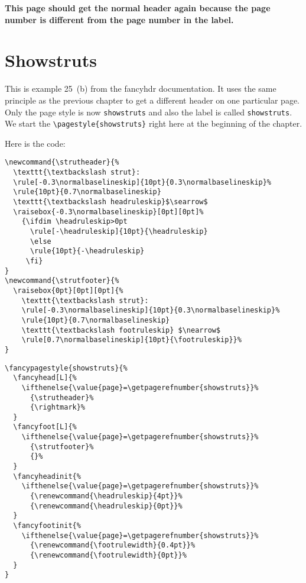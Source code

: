 \documentclass[openany]{book}
\newcommand{\strutheader}{%
  \texttt{\textbackslash strut}:
  \rule[-0.3\normalbaselineskip]{10pt}{0.3\normalbaselineskip}%
  \rule{10pt}{0.7\normalbaselineskip}
  \texttt{\textbackslash headruleskip}$\searrow$
  \raisebox{-0.3\normalbaselineskip}[0pt][0pt]%
    {\ifdim \headruleskip>0pt
      \rule[-\headruleskip]{10pt}{\headruleskip}
      \else
      \rule{10pt}{-\headruleskip}
     \fi}
}
\newcommand{\strutfooter}{%
  \raisebox{0pt}[0pt][0pt]{%
    \texttt{\textbackslash strut}:
    \rule[-0.3\normalbaselineskip]{10pt}{0.3\normalbaselineskip}%
    \rule{10pt}{0.7\normalbaselineskip}
    \texttt{\textbackslash footruleskip} $\nearrow$
    \rule[0.7\normalbaselineskip]{10pt}{\footruleskip}}%
}
\begin{document}
\lipsum[8-10]

\medskip

\noindent
\begin{boxedminipage}{\textwidth}
\textbf{This page should get the normal header again because the page number is different from the page number in the label.}
\end{boxedminipage}

\chapter{Showstruts}
\label{ch:showstruts}
\pagestyle{showstruts}

\begin{boxedminipage}{\textwidth}
This is example 25~(b) from the \textsf{fancyhdr} documentation. It uses the same principle as the previous chapter to get a different header on one particular page.
Only the page style is now \texttt{showstruts} and also the label is called \texttt{showstruts}.
We start the \verb|\pagestyle{showstruts}| right here at the beginning of the chapter.

Here is the code:

\begin{verbatim}
\newcommand{\strutheader}{%
  \texttt{\textbackslash strut}:
  \rule[-0.3\normalbaselineskip]{10pt}{0.3\normalbaselineskip}%
  \rule{10pt}{0.7\normalbaselineskip}
  \texttt{\textbackslash headruleskip}$\searrow$
  \raisebox{-0.3\normalbaselineskip}[0pt][0pt]%
    {\ifdim \headruleskip>0pt
      \rule[-\headruleskip]{10pt}{\headruleskip}
      \else
      \rule{10pt}{-\headruleskip}
     \fi}
}
\newcommand{\strutfooter}{%
  \raisebox{0pt}[0pt][0pt]{%
    \texttt{\textbackslash strut}:
    \rule[-0.3\normalbaselineskip]{10pt}{0.3\normalbaselineskip}%
    \rule{10pt}{0.7\normalbaselineskip}
    \texttt{\textbackslash footruleskip} $\nearrow$
    \rule[0.7\normalbaselineskip]{10pt}{\footruleskip}}%
}
\end{verbatim}
\end{boxedminipage}

\noindent
\begin{boxedminipage}{\textwidth}
\begin{verbatim}
\fancypagestyle{showstruts}{%
  \fancyhead[L]{%
    \ifthenelse{\value{page}=\getpagerefnumber{showstruts}}%
      {\strutheader}%
      {\rightmark}%
  }
  \fancyfoot[L]{%
    \ifthenelse{\value{page}=\getpagerefnumber{showstruts}}%
      {\strutfooter}%
      {}%
  }
  \fancyheadinit{%
    \ifthenelse{\value{page}=\getpagerefnumber{showstruts}}%
      {\renewcommand{\headruleskip}{4pt}}%
      {\renewcommand{\headruleskip}{0pt}}%
  }
  \fancyfootinit{%
    \ifthenelse{\value{page}=\getpagerefnumber{showstruts}}%
      {\renewcommand{\footrulewidth}{0.4pt}}%
      {\renewcommand{\footrulewidth}{0pt}}%
  }
}
\end{verbatim}
\end{boxedminipage}
\end{document}

